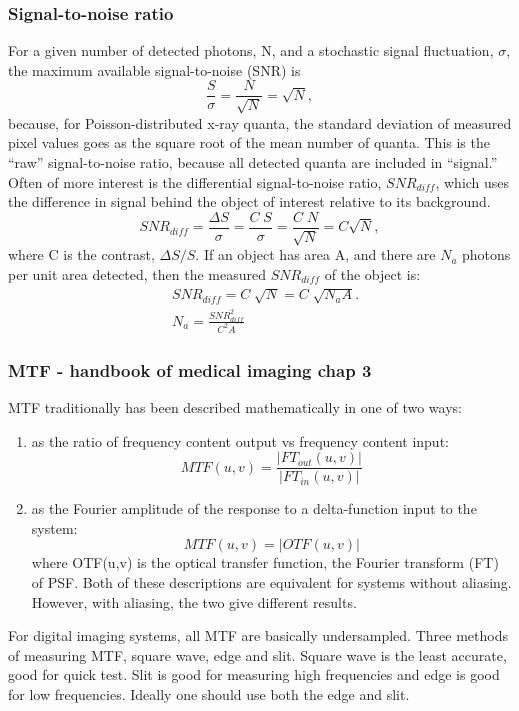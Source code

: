 \subsubsection{Signal-to-noise ratio}
For a given number of detected photons, N, and a stochastic signal fluctuation, $\sigma$, the maximum available signal-to-noise (SNR) is
\begin{equation}
\frac{S}{\sigma} = \frac{N}{\sqrt{N}} = \sqrt{N},
\end{equation}
because, for Poisson-distributed x-ray quanta, the standard deviation of measured pixel values goes as the square root of the mean number of quanta.  This is the ``raw'' signal-to-noise ratio, because all detected quanta are included in ``signal.''  Often of more interest is the differential signal-to-noise ratio, $SNR_{diff}$, which uses the difference in signal behind the object of interest relative to its background.
\begin{equation}
SNR_{diff} = \frac{\Delta S}{\sigma} = \frac{C \; S}{\sigma} = \frac{C \; N}{\sqrt{N}} = C \sqrt{N},
\end{equation}
where C is the contrast, $\Delta S / S$.
If an object has area A, and there are $N_a$ photons per unit area detected, then the measured $SNR_{diff}$ of the object is:
\begin{equation}
\begin{split}
& SNR_{diff} = C \; \sqrt{N} = C \; \sqrt{N_a A}.\\
& N_a = \frac{SNR_{diff}^2}{C^2 A}
\end{split}
\end{equation}

\subsubsection{MTF - handbook of medical imaging chap 3}
MTF traditionally has been described mathematically in one of two ways:
\begin{enumerate}
\item as the ratio of frequency content output vs frequency content input:
\begin{equation}
MTF(u,v) = \frac{|FT_{out}(u,v)|}{|FT_{in}(u,v)|}
\end{equation}

\item as the Fourier amplitude of the response to a delta-function input to the system:
\begin{equation}
MTF(u,v) = |OTF(u,v)|
\end{equation}
where OTF(u,v) is the optical transfer function, the Fourier transform (FT) of PSF.  Both of these descriptions are equivalent for systems without aliasing.  However, with aliasing, the two give different results.
\end{enumerate}
For digital imaging systems, all MTF are basically undersampled.
Three methods of measuring MTF, square wave, edge and slit.  Square wave is the least accurate, good for quick test.  Slit is good for measuring high frequencies and edge is good for low frequencies.  Ideally one should use both the edge and slit.

